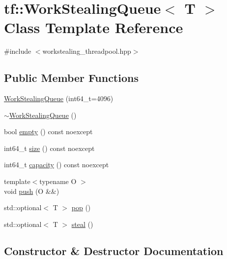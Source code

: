 \hypertarget{classtf_1_1WorkStealingQueue}{}\section{tf\+:\+:Work\+Stealing\+Queue$<$ T $>$ Class Template Reference}
\label{classtf_1_1WorkStealingQueue}


{\ttfamily \#include $<$workstealing\+\_\+threadpool.\+hpp$>$}

\subsection*{Public Member Functions}
\begin{DoxyCompactItemize}
\item 
\hyperlink{classtf_1_1WorkStealingQueue_aa55d570fe0d29d68f080c328218a0421}{Work\+Stealing\+Queue} (int64\+\_\+t=4096)
\item 
\hyperlink{classtf_1_1WorkStealingQueue_acb22a49430fd235aa2ae4770d1cd662b}{$\sim$\+Work\+Stealing\+Queue} ()
\item 
bool \hyperlink{classtf_1_1WorkStealingQueue_adc85682657a3cd6c0fe87a71d350036c}{empty} () const noexcept
\item 
int64\+\_\+t \hyperlink{classtf_1_1WorkStealingQueue_aada5323cb64e23796df418c5be124b29}{size} () const noexcept
\item 
int64\+\_\+t \hyperlink{classtf_1_1WorkStealingQueue_aa24605d46953ae1d27dd35451c72c9b3}{capacity} () const noexcept
\item 
{\footnotesize template$<$typename O $>$ }\\void \hyperlink{classtf_1_1WorkStealingQueue_a0d2632d5fbff766101df431b365790c0}{push} (O \&\&)
\item 
std\+::optional$<$ T $>$ \hyperlink{classtf_1_1WorkStealingQueue_a1ba75ce446b149de97e62310851a243d}{pop} ()
\item 
std\+::optional$<$ T $>$ \hyperlink{classtf_1_1WorkStealingQueue_a6b63dca550a2f576b92f05bdc2e03a74}{steal} ()
\end{DoxyCompactItemize}


\subsection{Constructor \& Destructor Documentation}
\mbox{\label{classtf_1_1WorkStealingQueue_aa55d570fe0d29d68f080c328218a0421}} 
